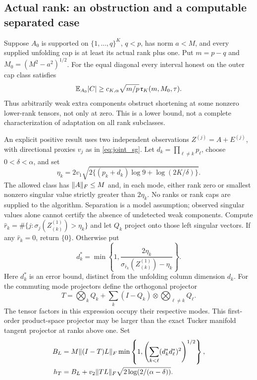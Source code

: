 \subsection{Actual rank: an obstruction and a computable separated case}

\begin{theorem}\label{thm:shifted_adaptation}
Suppose $A_0$ is supported on $\{1,\ldots,q\}^K$, $q<p$, has norm $a<M$, and every supplied unfolding cap is at least its actual rank plus one. Put $m=p-q$ and $M_0=(M^2-a^2)^{1/2}$. For the equal diagonal every interval honest on the outer cap class satisfies
\[
 \mathbb E_{A_0}|C|\ge c_{K,\alpha}\sqrt{m/p}\,
           \mathfrak r_K(m,M_0,\tau).
\]
Thus arbitrarily weak extra components obstruct shortening at some nonzero lower-rank tensors, not only at zero. This is a lower bound, not a complete characterization of adaptation on all rank subclasses.
\end{theorem}

An explicit positive result uses two independent observations
$Z^{(j)}=A+E^{(j)}$, with directional proxies $v_j$ as in \eqref{eq:joint_sg}. Let $d_k=\prod_{\ell\ne k}p_\ell$, choose $0<\delta<\alpha$, and set
\begin{equation}\label{eq:pilot_eta}
 \eta_k=2v_1\sqrt{2\{(p_k+d_k)\log9+\log(2K/\delta)\}}.
\end{equation}
The allowed class has $\lVert A\rVert_F\le M$ and, in each mode, either rank zero or smallest nonzero singular value strictly greater than $2\eta_k$. No ranks or rank caps are supplied to the algorithm. Separation is a model assumption; observed singular values alone cannot certify the absence of undetected weak components.
Compute $\widehat r_k=\#\{j:\sigma_j(Z^{(1)}_{(k)})>\eta_k\}$ and let $Q_k$ project onto those left singular vectors. If any $\widehat r_k=0$, return $\{0\}$. Otherwise put
\[
 d_k^*=\min\left\{1,\frac{2\eta_k}{\sigma_{\widehat r_k}(Z^{(1)}_{(k)})-\eta_k}\right\}.
\]
Here $d_k^*$ is an error bound, distinct from the unfolding column dimension $d_k$.
For the commuting mode projectors define the orthogonal projector
\[
 T=\bigotimes_k Q_k+
       \sum_k (I-Q_k)\otimes\bigotimes_{\ell\ne k}Q_\ell.
\]
The tensor factors in this expression occupy their respective modes. This first-order product-space projector may be larger than the exact Tucker manifold tangent projector at ranks above one. Set
\begin{align}
 B_L&=M\lVert (I-T)L\rVert_F
      \min\left\{1,\left(\sum_{k<\ell}(d_k^*d_\ell^*)^2\right)^{1/2}\right\},\label{eq:adaptive_bias}\\
 h_T&=B_L+v_2\lVert TL\rVert_F\sqrt{2\log(2/(\alpha-\delta))}.
\end{align}

